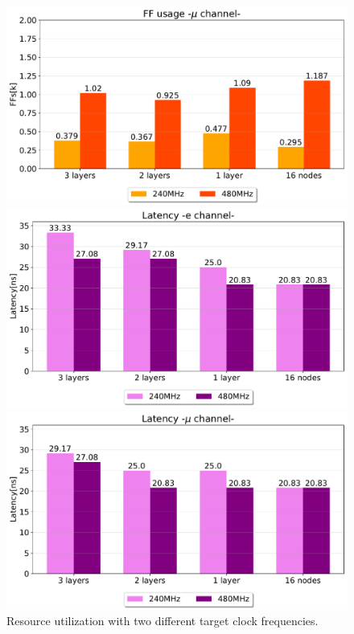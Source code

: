 \documentclass[../../main.tex]{subfiles}
\begin{document}
\begin{figure}[!ht]
\begin{minipage}[b]{0.5\linewidth}
    \vspace{4ex}
  \end{minipage}%
  \begin{minipage}[b]{0.5\linewidth}
    \centering
    \includegraphics[width=.82\linewidth]{sections/05/Images/FF_usage1mu_@480.pdf} 
    \vspace{4ex}
  \end{minipage}
  \begin{minipage}[b]{0.5\linewidth}
    \centering
    \includegraphics[width=.82\linewidth]{sections/05/Images/Latency_1ele_@480.pdf} 
    \vspace{4ex}
  \end{minipage}%
  \begin{minipage}[b]{0.5\linewidth}
    \centering
    \includegraphics[width=.82\linewidth]{sections/05/Images/Latency_1mu_@480.pdf} 
    \vspace{4ex}
  \end{minipage}
  \caption{Resource utilization with two different target clock frequencies.}
  \label{fig:240vs480}
\end{figure}
    
\end{document}
